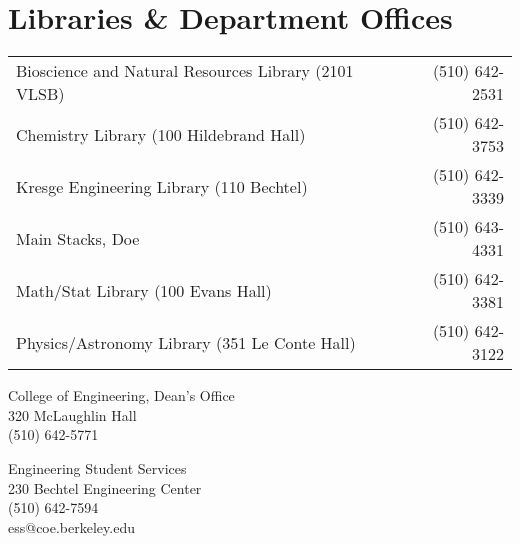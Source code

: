 \chapter*{Libraries \& Department Offices}

\begin{tabular}{lr}
  Bioscience and Natural Resources Library (2101 VLSB) & (510) 642-2531 \\
  Chemistry Library (100 Hildebrand Hall) & (510) 642-3753 \\
  Kresge Engineering Library (110 Bechtel) & (510) 642-3339 \\
  Main Stacks, Doe & (510) 643-4331 \\
  Math/Stat Library (100 Evans Hall) & (510) 642-3381 \\
  Physics/Astronomy Library (351 Le Conte Hall) & (510) 642-3122
\end{tabular}

College of Engineering, Dean’s Office \\
320 McLaughlin Hall \\
(510) 642-5771

Engineering Student Services \\
230 Bechtel Engineering Center \\
(510) 642-7594 \\
{\selectfont ess@coe.berkeley.edu}



